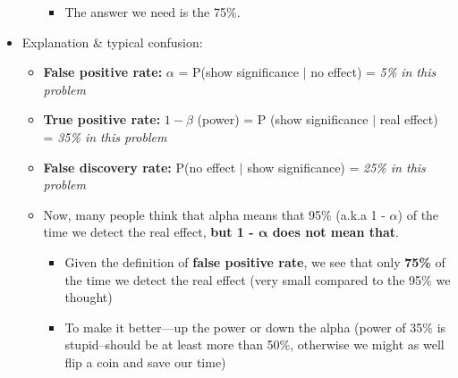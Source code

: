 \begin{itemize}
\begin{itemize}
\begin{itemize}
            \item The answer we need is the 75\%.
        \end{itemize}
    \end{itemize}
    \item Explanation \& typical confusion:
    \begin{itemize}
        \item \textbf{False positive rate:} $\alpha$ = P(show significance $|$ no effect) = \textit{5\% in this problem}
        \item \textbf{True positive rate:} $1 - \beta$ (power) = P (show significance $|$ real effect) = \textit{35\% in this problem}
        \item \textbf{False discovery rate:}  P(no effect $|$ show significance) = \textit{25\% in this problem}
        \item Now, many people think that alpha means that 95\% (a.k.a 1 - $\alpha$) of the time we detect the real effect, \textbf{but 1 - $\pmb{\alpha}$ does not mean that}. 
        \begin{itemize}
            \item Given the definition of \textbf{false positive rate}, we see that only \textbf{75\%} of the time we detect the real effect (very small compared to the 95\% we thought)
            \item To make it better---up the power or down the alpha (power of 35\% is stupid--should be at least more than 50\%, otherwise we might as well flip a coin and save our time)
        \end{itemize}
    \end{itemize}
\end{itemize}

